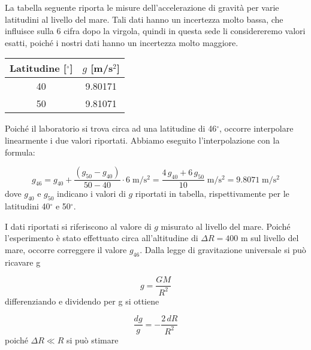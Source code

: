 
La tabella seguente riporta le misure dell'accelerazione di gravità
per varie latitudini al livello del mare. Tali dati hanno un incertezza molto bassa,
che influisce sulla 6 cifra dopo la virgola, quindi in questa sede li considereremo valori esatti,
poiché i nostri dati hanno un incertezza molto maggiore.

\begin{center}
    \begin{tabular}{c c}
        \toprule
        Latitudine [$^\circ$] & $g$ [m/s$^2$] \\
        \midrule
        40 & 9.80171 \\
        50 & 9.81071 \\
        \bottomrule
    \end{tabular}
\end{center}

Poiché il laboratorio si trova circa ad una latitudine di 46$^\circ$, occorre interpolare linearmente i due valori
riportati. Abbiamo eseguito l'interpolazione con la formula:

\begin{equation}
    g_{46} = g_{40} + \frac{(g_{50} - g_{40})}{50 - 40} \cdot 6 \; \si{\meter\per\square\second} =
    \frac{4\, g_{40} + 6\, g_{50}}{10} \; \si{\meter\per\square\second} =
    9.8071 \; \si{\meter\per\square\second}
    \label{eq:g46}
\end{equation}
%
dove $g_{40}$ e $g_{50}$ indicano i valori di $g$ riportati in tabella, rispettivamente per le latitudini 40$^\circ$ e 50$^\circ$.

I dati riportati si riferiscono al valore di $g$ misurato al livello del mare. Poiché l'esperimento è stato effettuato circa all'altitudine di
$\Delta R = 400$ m sul livello del mare, occorre correggere il valore $g_{46}$. Dalla legge di gravitazione universale si può ricavare g

\begin{equation}
    g = \frac{GM}{R^2}
\end{equation}
%
differenziando e dividendo per g si ottiene

\begin{equation}
    \frac{dg}{g} = - \frac{2\,dR}{R^2}
\end{equation}
%
poiché $\Delta R \ll R$ si può stimare

